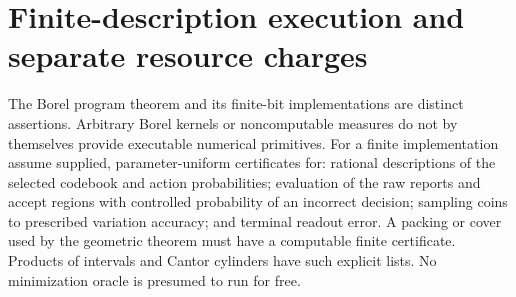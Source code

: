 \section{Finite-description execution and separate resource charges}\label{app:compute}
The Borel program theorem and its finite-bit implementations are distinct assertions. Arbitrary Borel kernels or noncomputable measures do not by themselves provide executable numerical primitives. For a finite implementation assume supplied, parameter-uniform certificates for: rational descriptions of the selected codebook and action probabilities; evaluation of the raw reports and accept regions with controlled probability of an incorrect decision; sampling coins to prescribed variation accuracy; and terminal readout error. A packing or cover used by the geometric theorem must have a computable finite certificate. Products of intervals and Cantor cylinders have such explicit lists. No minimization oracle is presumed to run for free.

